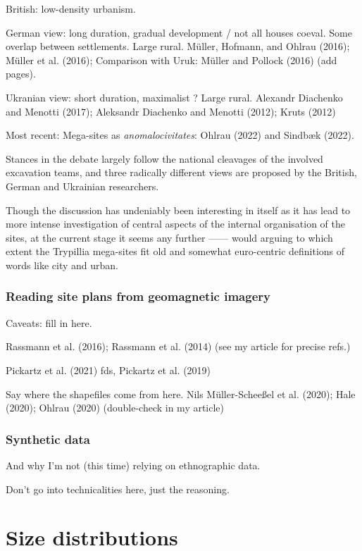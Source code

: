 \documentclass[
  12pt,
  a4paper, twoside]{book}
\begin{document}
British: low-density urbanism.

German view: long duration, gradual development / not all houses coeval. Some overlap between settlements. Large rural. Müller, Hofmann, and Ohlrau (2016); Müller et al. (2016); Comparison with Uruk: Müller and Pollock (2016) (add pages).

Ukranian view: short duration, maximalist ? Large rural. Alexandr Diachenko and Menotti (2017); Aleksandr Diachenko and Menotti (2012); Kruts (2012)

Most recent: Mega-sites as \emph{anomalocivitates}: Ohlrau (2022) and Sindbæk (2022).

Stances in the debate largely follow the national cleavages of the involved excavation teams, and three radically different views are proposed by the British, German and Ukrainian researchers.

Though the discussion has undeniably been interesting in itself as it has lead to more intense investigation of central aspects of the internal organisation of the sites, at the current stage it seems any further ------ would arguing to which extent the Trypillia mega-sites fit old and somewhat euro-centric definitions of words like city and urban.

\hypertarget{reading-site-plans-from-geomagnetic-imagery}{%
\section{Reading site plans from geomagnetic imagery}\label{reading-site-plans-from-geomagnetic-imagery}}

Caveats: fill in here.

Rassmann et al. (2016); Rassmann et al. (2014) (see my article for precise refs.)

Pickartz et al. (2021) fds, Pickartz et al. (2019)

Say where the shapefiles come from here. Nils Müller-Scheeßel et al. (2020); Hale (2020); Ohlrau (2020) (double-check in my article)

\hypertarget{synthetic-data}{%
\section{Synthetic data}\label{synthetic-data}}

And why I'm not (this time) relying on ethnographic data.

Don't go into technicalities here, just the reasoning.

\hypertarget{part-size-distributions}{%
\part{Size distributions}\label{part-size-distributions}}
\end{document}
